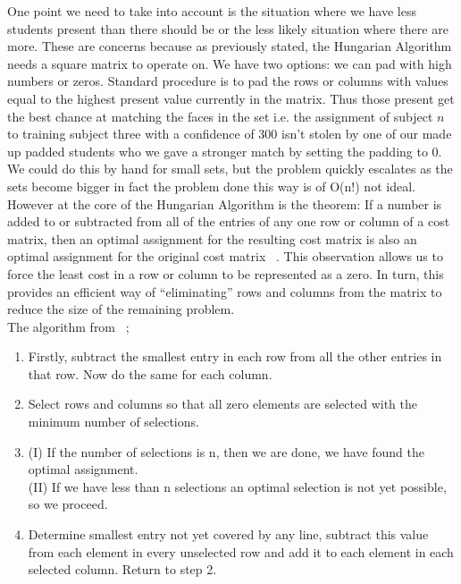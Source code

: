One point we need to take into account is the situation where we have less students present than there 
should be or the less likely situation where there are more.  These are concerns because as previously stated, 
the Hungarian Algorithm needs a square matrix to operate on.  We have two options: we can pad with high numbers 
or zeros.  Standard procedure is to pad the rows or columns with values equal to the highest present value 
currently in the matrix.  Thus those present get the best chance at matching the faces in the set i.e. the 
assignment of subject $n$ to training subject three with a confidence of 300 isn't stolen by one of our made up 
padded students who we gave a stronger match by setting the padding to 0. \\

We could do this by hand for small sets, but the problem quickly escalates as the sets become bigger 
in fact the problem done this way is of O(n!) not ideal.  However at the core of the Hungarian Algorithm 
is the theorem: If a number is added to or subtracted from all of the entries of any one row or column 
of a cost matrix, then an optimal assignment for the resulting cost matrix is also an optimal assignment 
for the original cost matrix ~\cite{Hungarian_alg}. This observation allows us to force the least cost 
in a row or column to be represented as a zero.  In turn, this provides an efficient way of ``eliminating'' 
rows and columns from the matrix to reduce the size of the remaining problem. \\

The algorithm from ~\cite{Hungarian_alg};
\begin{enumerate}
	\item Firstly, subtract the smallest entry in each row from all the other entries in that row.  Now do the same for each column. 
	\item Select rows and columns so that all zero elements are selected with the minimum number of selections. 
	\item (I) If the number of selections is n, then we are done, we have found the optimal assignment. \\
		  (II) If we have less than n selections an optimal selection is not yet possible, so we proceed. 
	\item Determine smallest entry not yet covered by any line, subtract this value from each element in every unselected row 
		  and add it to each element in each selected column.   Return to step 2.
\end{enumerate}

